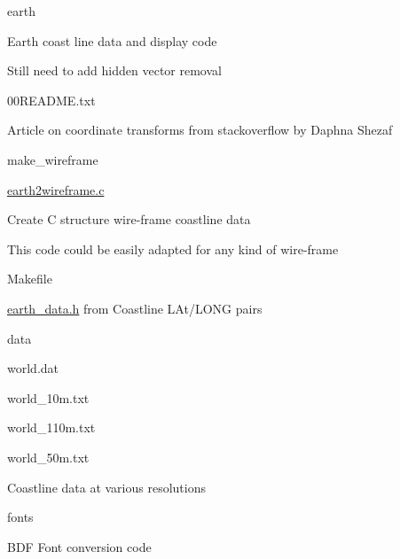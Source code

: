 \begin{DoxyItemize}
\item earth
\begin{DoxyItemize}
\item Earth coast line data and display code
\item Still need to add hidden vector removal
\begin{DoxyItemize}
\item 00\-R\-E\-A\-D\-M\-E.\-txt
\begin{DoxyItemize}
\item Article on coordinate transforms from stackoverflow by Daphna Shezaf
\end{DoxyItemize}
\item make\-\_\-wireframe
\begin{DoxyItemize}
\item \hyperlink{earth2wireframe_8c}{earth2wireframe.\-c}
\begin{DoxyItemize}
\item Create C structure wire-\/frame coastline data
\item This code could be easily adapted for any kind of wire-\/frame
\end{DoxyItemize}
\item Makefile
\begin{DoxyItemize}
\item \hyperlink{earth__data_8h}{earth\-\_\-data.\-h} from Coastline L\-At/\-L\-O\-N\-G pairs
\end{DoxyItemize}
\item data
\begin{DoxyItemize}
\item world.\-dat
\item world\-\_\-10m.\-txt
\item world\-\_\-110m.\-txt
\item world\-\_\-50m.\-txt
\begin{DoxyItemize}
\item Coastline data at various resolutions
\end{DoxyItemize}
\end{DoxyItemize}
\end{DoxyItemize}
\end{DoxyItemize}
\end{DoxyItemize}
\item fonts
\begin{DoxyItemize}
\item B\-D\-F Font conversion code
\begin{DoxyItemize}

\end{DoxyItemize}
\end{DoxyItemize}
\end{DoxyItemize}
